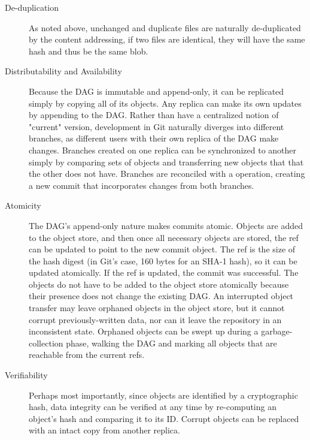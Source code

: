 \begin{description}

    \item[De-duplication] As noted above, unchanged and duplicate files are
        naturally de-duplicated by the content addressing, if two files are
        identical, they will have the same hash and thus be the same blob.

    \item[Distributability and Availability] Because the DAG is immutable and
        append-only, it can be replicated simply by copying all of its objects.
        Any replica can make its own updates by appending to the DAG. Rather
        than have a centralized notion of "current" version, development in Git
        naturally diverges into different branches, as different users with
        their own replica of the DAG make changes. Branches created on one
        replica can be synchronized to another simply by comparing sets of
        objects and transferring new objects that that the other does not have.
        Branches are reconciled with a  operation, creating a new
        commit that incorporates changes from both branches.

    \item[Atomicity] The DAG's append-only nature makes commits atomic. Objects
        are added to the object store, and then once all necessary objects are
        stored, the ref can be updated to point to the new commit object. The
        ref is the size of the hash digest (in Git's case, \num{160} bytes for
        an SHA-1 hash), so it can be updated atomically. If the ref is updated,
        the commit was successful. The objects do not have to be added to the
        object store atomically because their presence does not change the
        existing DAG. An interrupted object transfer may leave orphaned objects
        in the object store, but it cannot corrupt previously-written data, nor
        can it leave the repository in an inconsistent state. Orphaned objects
        can be swept up during a garbage-collection phase, walking the DAG and
        marking all objects that are reachable from the current refs.

    \item[Verifiability] Perhaps most importantly, since objects are identified
        by a cryptographic hash, data integrity can be verified at any time by
        re-computing an object's hash and comparing it to its ID. Corrupt
        objects can be replaced with an intact copy from another replica.

\end{description}

